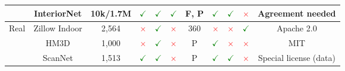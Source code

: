 \begin{table}
\begin{centering}
{\begin{tabular}{|c|c|c|ccccccc|c|}
\cline{2-11} \cline{3-11} \cline{4-11} \cline{5-11} \cline{6-11} \cline{7-11} \cline{8-11} \cline{9-11} \cline{10-11} \cline{11-11} 
 & InteriorNet & 10k/1.7M & \textcolor{green}{$\checkmark$} & \textcolor{green}{$\checkmark$} & \textcolor{green}{$\checkmark$} & F, P & \textcolor{green}{$\checkmark$} & \textcolor{green}{$\checkmark$} & \textcolor{red}{$\times$} & Agreement needed\tabularnewline
\hline 
\multirow{3}{*}{Real} & Zillow Indoor & 2,564 & \textcolor{red}{$\times$} & \textcolor{green}{$\checkmark$} & \textcolor{red}{$\times$} & 360 & \textcolor{red}{$\times$} & \textcolor{red}{$\times$} & \textcolor{green}{$\checkmark$} & Apache 2.0\tabularnewline
\cline{2-11} \cline{3-11} \cline{4-11} \cline{5-11} \cline{6-11} \cline{7-11} \cline{8-11} \cline{9-11} \cline{10-11} \cline{11-11} 
 & HM3D & 1,000 & \textcolor{red}{$\times$} & \textcolor{green}{$\checkmark$} & \textcolor{red}{$\times$} & P & \textcolor{green}{$\checkmark$} & \textcolor{red}{$\times$} & \textcolor{red}{$\times$} & MIT\tabularnewline
\cline{2-11} \cline{3-11} \cline{4-11} \cline{5-11} \cline{6-11} \cline{7-11} \cline{8-11} \cline{9-11} \cline{10-11} \cline{11-11} 
 & ScanNet & 1,513 & \textcolor{green}{$\checkmark$} & \textcolor{green}{$\checkmark$} & \textcolor{red}{$\times$} & P & \textcolor{green}{$\checkmark$} & \textcolor{green}{$\checkmark$} & \textcolor{red}{$\times$} & Special license (data)\tabularnewline
\hline 
\end{tabular}
}
\par\end{centering}
\end{table}

